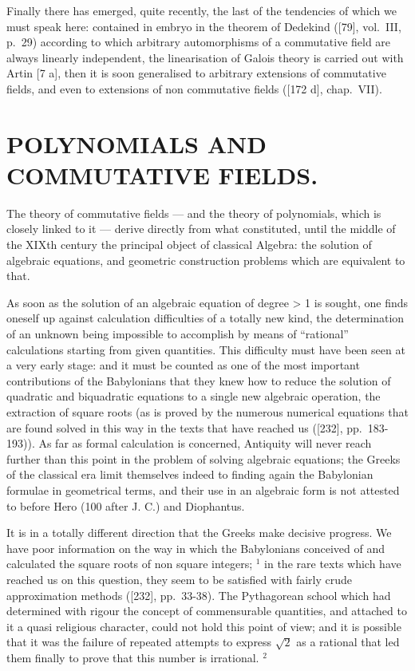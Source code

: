 Finally there has emerged, quite recently, the last of the tendencies of which we must speak here: contained in embryo in the theorem of Dedekind ({[}79{]}, vol.~III, p.~29) according to which arbitrary automorphisms of a commutative field are always linearly independent, the linearisation of Galois theory is carried out with Artin {[}7 a{]}, then it is soon generalised to arbitrary extensions of commutative fields, and even to extensions of non commutative fields ({[}172 d{]}, chap.~VII).

\chapter{POLYNOMIALS AND COMMUTATIVE FIELDS.}

The theory of commutative fields --- and the theory of polynomials, which is closely linked to it --- derive directly from what constituted, until the middle of the XIXth century the principal object of classical Algebra: the solution of algebraic equations, and geometric construction problems which are equivalent to that.

As soon as the solution of an algebraic equation of degree \textgreater{} 1 is sought, one finds oneself up against calculation difficulties of a totally new kind, the determination of an unknown being impossible to accomplish by means of ``rational'' calculations starting from given quantities. This difficulty must have been seen at a very early stage: and it must be counted as one of the most important contributions of the Babylonians that they knew how to reduce the solution of quadratic and biquadratic equations to a single new algebraic operation, the extraction of square roots (as is proved by the numerous numerical equations that are found solved in this way in the texts that have reached us ({[}232{]}, pp.~183-193)). As far as formal calculation is concerned, Antiquity will never reach further than this point in the problem of solving algebraic equations; the Greeks of the classical era limit themselves indeed to finding again the Babylonian formulae in geometrical terms, and their use in an algebraic form is not attested to before Hero (100 after J. C.) and Diophantus.

It is in a totally different direction that the Greeks make decisive progress. We have poor information on the way in which the Babylonians conceived of and calculated the square roots of non square integers; \(^{1}\) in the rare texts which have reached us on this question, they seem to be satisfied with fairly crude approximation methods ({[}232{]}, pp.~33-38). The Pythagorean school which had determined with rigour the concept of commensurable quantities, and attached to it a quasi religious character, could not hold this point of view; and it is possible that it was the failure of repeated attempts to express \(\sqrt{2}\) as a rational that led them finally to prove that this number is irrational. \(^{2}\)

